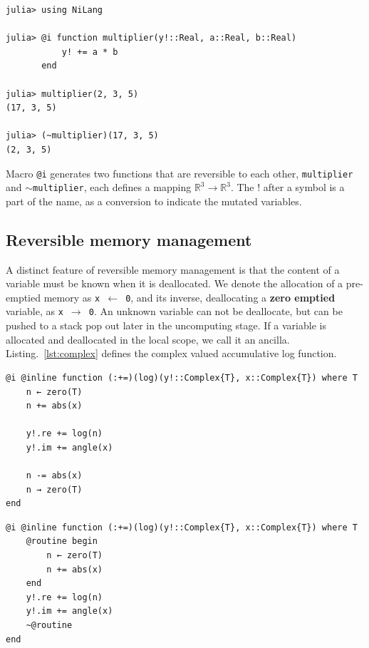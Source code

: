 \documentclass{article}
\newcommand{\<}{\langle}
\renewcommand{\>}{\rangle}
\newcommand{\Lst}[1]{Listing.~\ref{#1}}
\theoremstyle{definition}\newtheorem{definition}{\textit{Definition}}
\begin{document}
\begin{minipage}{.88\columnwidth}
\begin{lstlisting}[mathescape=true,caption={A reversible multiplier},label={lst:multiplier}]
julia> using NiLang

julia> @i function multiplier(y!::Real, a::Real, b::Real)
           y! += a * b
       end

julia> multiplier(2, 3, 5)
(17, 3, 5)

julia> (~multiplier)(17, 3, 5)
(2, 3, 5)
\end{lstlisting}
\end{minipage}

Macro \texttt{@i} generates two functions that are reversible to each other, \texttt{multiplier} and \texttt{$\sim$multiplier}, each defines a mapping $\mathbb{R}^3 \rightarrow \mathbb{R}^3$. The $!$ after a symbol is a part of the name, as a conversion to indicate the mutated variables.

\subsection{Reversible memory management}
A distinct feature of reversible memory management is that the content of a variable must be known when it is deallocated.
We denote the allocation of a pre-emptied memory as \texttt{x $\leftarrow$ 0}, and its inverse, deallocating a \textbf{zero emptied} variable, as \texttt{x $\rightarrow$ 0}.
An unknown variable can not be deallocate, but can be pushed to a stack pop out later in the uncomputing stage.
If a variable is allocated and deallocated in the local scope, we call it an ancilla.
\Lst{lst:complex} defines the complex valued accumulative log function.

\begin{minipage}{.45\columnwidth}
\begin{lstlisting}[mathescape=true,caption={Reversible complex valued log function $y\mathrel{+}=\log(|x|) + i{\rm Arg}(x)$.},label={lst:complex}]
@i @inline function (:+=)(log)(y!::Complex{T}, x::Complex{T}) where T
    n ← zero(T)
    n += abs(x)

    y!.re += log(n)
    y!.im += angle(x)

    n -= abs(x)
    n → zero(T)
end
\end{lstlisting}
\end{minipage}\hfill
\begin{minipage}{.45\columnwidth}
    \begin{lstlisting}[mathescape=true,caption={Compute-copy-uncompute version of \Lst{lst:complex}},label={lst:complex2}]
@i @inline function (:+=)(log)(y!::Complex{T}, x::Complex{T}) where T
    @routine begin
        n ← zero(T)
        n += abs(x)
    end
    y!.re += log(n)
    y!.im += angle(x)
    ~@routine
end
\end{lstlisting}
\end{minipage}
\end{document}
